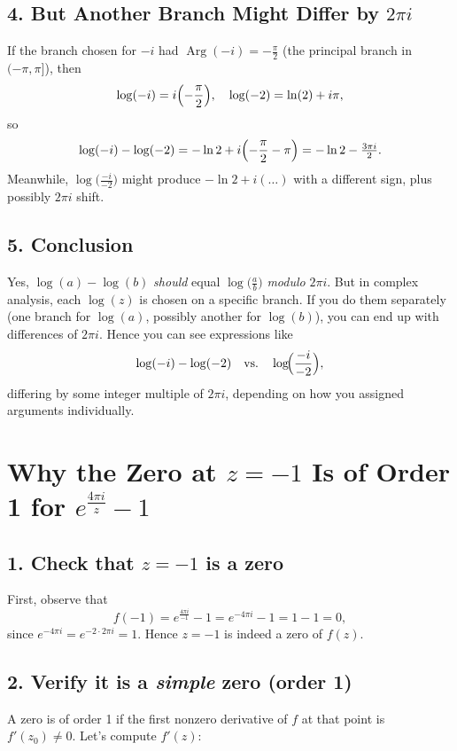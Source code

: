 \documentclass[12pt]{article}
\DeclareMathOperator{\Arg}{Arg}
\theoremstyle{definition} %
\theoremstyle{plain} %
\begin{document}
\subsection*{4. But Another Branch Might Differ by \(2\pi i\)}

If the branch chosen for $-i$ had $\Arg(-i) = -\frac{\pi}{2}$ (the principal branch in $(-\pi,\pi]$), then 
\[
\log(-i) = i\Bigl(-\frac{\pi}{2}\Bigr),
\quad
\log(-2)= \ln(2) + i\pi,
\]
so
\[
\log(-i) - \log(-2)
= -\ln 2 + i\Bigl(-\frac{\pi}{2} - \pi\Bigr)
= -\ln 2 - \tfrac{3\pi i}{2}.
\]
Meanwhile, 
\(\log\bigl(\tfrac{-i}{-2}\bigr)\) might produce $-\ln 2 + i(\dots)$ with a different sign, plus possibly $2\pi i$ shift.  

\subsection*{5. Conclusion}

Yes, \(\log(a) - \log(b)\) \emph{should} equal \(\log\!\bigl(\tfrac{a}{b}\bigr)\) \emph{modulo} $2\pi i$. But in complex analysis, each $\log(z)$ is chosen on a specific branch. If you do them separately (one branch for $\log(a)$, possibly another for $\log(b)$), you can end up with differences of $2\pi i$. Hence you can see expressions like
\[
\log(-i) - \log(-2) 
\quad\text{vs.}\quad
\log\!\Bigl(\frac{-i}{-2}\Bigr),
\]
differing by some integer multiple of $2\pi i$, depending on how you assigned arguments individually. 

\section*{Why the Zero at \(z=-1\) Is of Order 1 for \(\displaystyle e^{\frac{4\pi i}{z}} - 1\)}

\subsection*{1. Check that \(z=-1\) is a zero}

First, observe that
\[
f(-1) 
= e^{\frac{4\pi i}{-1}} - 1
= e^{-4\pi i} - 1
= 1 - 1
= 0,
\]
since $e^{-4\pi i} = e^{-2\cdot 2\pi i} = 1$.  Hence $z=-1$ is indeed a zero of $f(z)$.

\subsection*{2. Verify it is a \emph{simple} zero (order 1)}

A zero is of order 1 if the first nonzero derivative of $f$ at that point is $f'(z_0)\neq0$.  Let's compute $f'(z)$:
\end{document}
